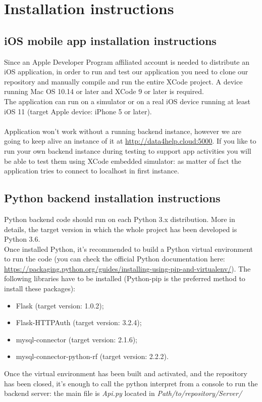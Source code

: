 \documentclass{article}
\begin{document}
\newpage
\section{Installation instructions}

\subsection{iOS mobile app installation instructions}
Since an Apple Developer Program affiliated account is needed to distribute an iOS application, in order to run and test our application you need to clone our repository and manually compile and run the entire XCode project. A device running Mac OS 10.14 or later and XCode 9 or later is required. \\
	The application can run on a simulator or on a real iOS device running at least iOS 11 (target Apple device: iPhone 5 or later).	\\\\
	Application won't work without a running backend instance, however we are going to keep alive an instance of it at \url{http://data4help.cloud:5000}.
	If you like to run your own backend instance during testing to support app activities you will be able to test them using XCode embedded simulator: as matter of fact the application tries to connect to localhost in first instance.
	
\subsection{Python backend installation instructions}
Python backend code should run on each Python 3.x distribution. More in details, the target version in which the whole project has been developed is Python 3.6.\\
Once installed Python, it's recommended to build a Python virtual environment to run the code (you can check the official Python documentation here: \url{https://packaging.python.org/guides/installing-using-pip-and-virtualenv/}). The following libraries have to be installed (Python-pip is the preferred method to install these packages):
\begin{itemize}
	\item Flask (target version: 1.0.2);
	\item Flask-HTTPAuth (target version: 3.2.4);
	\item mysql-connector (target version: 2.1.6);
	\item mysql-connector-python-rf (target version: 2.2.2).
\end{itemize}
Once the virtual environment has been built and activated, and the repository has been closed, it's enough to call the python interpret from a console to run the backend server: the main file is \textit{Api.py} located in \textit{Path/to/repository/Server/} 
\end{document}
